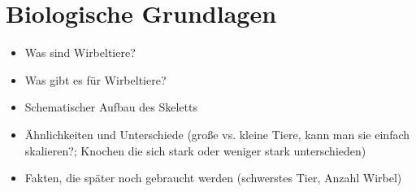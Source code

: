 \chapter{Biologische Grundlagen}

\begin{itemize}
 \item Was sind Wirbeltiere?
 \item Was gibt es für Wirbeltiere?
 \item Schematischer Aufbau des Skeletts
 \item Ähnlichkeiten und Unterschiede (\zb große vs. kleine Tiere, kann man sie einfach skalieren?; Knochen die sich stark oder weniger stark unterschieden)
 \item Fakten, die später noch gebraucht werden (\zb schwerstes Tier, Anzahl Wirbel)
\end{itemize}



